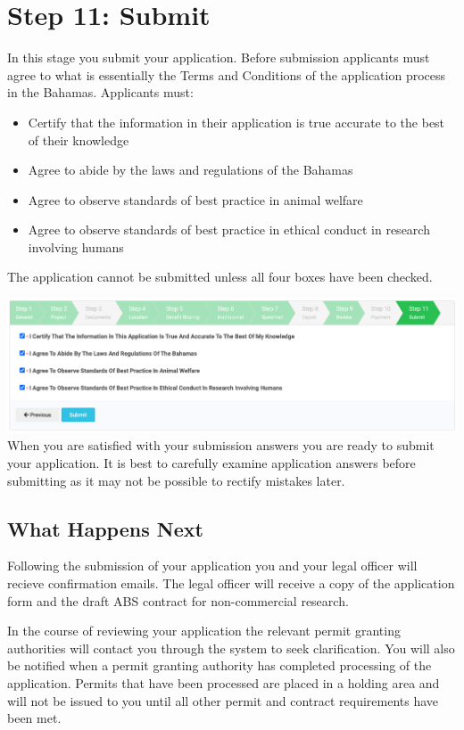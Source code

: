 \documentclass[
]{book}
\providecommand{\tightlist}{%
  \setlength{\itemsep}{0pt}\setlength{\parskip}{0pt}}
\begin{document}
\hypertarget{step-11-submit}{%
\chapter{Step 11: Submit}\label{step-11-submit}}

In this stage you submit your application. Before submission applicants must agree to what is essentially the Terms and Conditions of the application process in the Bahamas. Applicants must:

\begin{itemize}
\tightlist
\item
  Certify that the information in their application is true accurate to the best of their knowledge
\item
  Agree to abide by the laws and regulations of the Bahamas
\item
  Agree to observe standards of best practice in animal welfare
\item
  Agree to observe standards of best practice in ethical conduct in research involving humans
\end{itemize}

The application cannot be submitted unless all four boxes have been checked.

\includegraphics{images/submit.png}
When you are satisfied with your submission answers you are ready to submit your application. It is best to carefully examine application answers before submitting as it may not be possible to rectify mistakes later.

\hypertarget{what-happens-next}{%
\section{What Happens Next}\label{what-happens-next}}

Following the submission of your application you and your legal officer will recieve confirmation emails. The legal officer will receive a copy of the application form and the draft ABS contract for non-commercial research.

In the course of reviewing your application the relevant permit granting authorities will contact you through the system to seek clarification. You will also be notified when a permit granting authority has completed processing of the application. Permits that have been processed are placed in a holding area and will not be issued to you until all other permit and contract requirements have been met.
\end{document}
